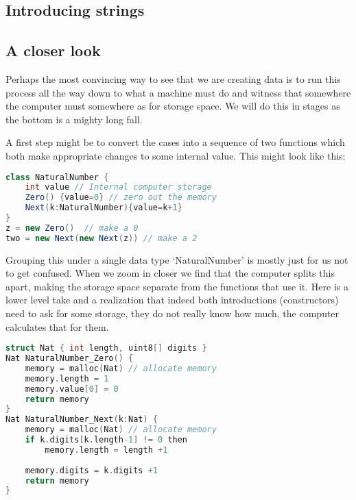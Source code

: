 \subsection{Introducing strings}


\subsection{A closer look}
Perhaps the most convincing way to see that we are creating 
data is to run this process all the way down to what a machine 
must do and witness that somewhere the computer must somewhere 
as for storage space.  We will do this 
in stages as the bottom is a mighty long fall.

A first step might be to convert the cases into a sequence 
of two functions which both make appropriate changes to 
some internal value.  This might look like this:
\begin{center}
\begin{lstlisting}[language=Java]
class NaturalNumber {
    int value // Internal computer storage
    Zero() {value=0} // zero out the memory
    Next(k:NaturalNumber){value=k+1}
}
z = new Zero()  // make a 0
two = new Next(new Next(z)) // make a 2
\end{lstlisting}
\end{center}

Grouping this under a single data type `NaturalNumber'
is mostly just for us not to get confused.  When we 
zoom in closer we find that the computer splits 
this apart, making the storage space separate from the 
functions that use it.  Here is a lower level take
and a realization that indeed both introductions (constructors)
need to ask for some storage, they do not really know 
how much, the computer calculates that for them.
\begin{center}
\begin{lstlisting}[language=C]
struct Nat { int length, uint8[] digits }
Nat NaturalNumber_Zero() { 
    memory = malloc(Nat) // allocate memory
    memory.length = 1
    memory.value[0] = 0
    return memory 
}
Nat NaturalNumber_Next(k:Nat) {
    memory = malloc(Nat) // allocate memory
    if k.digits[k.length-1] != 0 then
        memory.length = length +1
    
    memory.digits = k.digits +1
    return memory 
}
\end{lstlisting}
\end{center}

